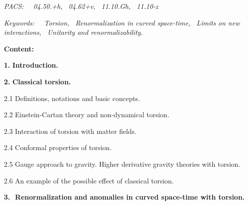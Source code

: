 \noindent
{\sl PACS: $\,$ $\,$ 04.50.+h,  $\,$ 04.62+v,  
$\,$ 11.10.Gh,  $\,$ 11.10-z}

\vskip 6mm
\noindent
{\sl Keywords:   $\,$ $\,$ Torsion, $\,$ Renormalization in curved space-time, 
$\,$ Limits on new interactions, $\,$ Unitarity and renormalizability. }


\newpage
\noindent
{\Large\bf Content:}
\vskip 6mm


{\large\bf 1.$\,\,$Introduction.}

\vskip 3mm 
{\large\bf 2.$\,\,$Classical torsion.}

\vskip 1mm \noindent
{2.1$\,\,$Definitions, notations and basic concepts.}

\vskip 1mm \noindent
{2.2$\,\,$Einstein-Cartan theory and non-dynamical torsion.}

\vskip 1mm \noindent
{2.3$\,\,$Interaction of torsion with matter fields.}

\vskip 1mm \noindent
{2.4$\,\,$Conformal properties of torsion.}

\vskip 1mm \noindent
{2.5$\,\,$Gauge approach to gravity. Higher derivative
gravity theories with torsion.}

\vskip 1mm \noindent
{2.6$\,\,$An example of the possible effect of 
classical torsion.}

\vskip 3mm {\large\bf 3.$\,\,$
Renormalization and anomalies in curved space-time 
with torsion.}

